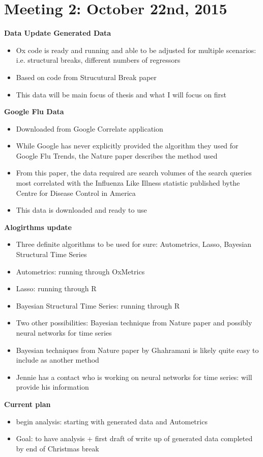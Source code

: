 \documentclass[11pt, oneside]{book}   	%
\begin{document}
\section{Meeting 2: October 22nd, 2015}
\textbf{Data Update Generated Data}
\begin{itemize}
\item Ox code is ready and running and able to be adjusted for multiple scenarios: i.e. structural breaks, different numbers of regressors
\item Based on code from Strucutural Break paper
\item This data will be main focus of thesis and what I will focus on first
\end{itemize}
\textbf{Google Flu Data}
\begin{itemize}
\item Downloaded from Google Correlate application
\item While Google has never explicitly provided the algorithm they used for Google Flu Trends, the Nature paper describes the method used
\item From this paper, the data required are search volumes of the search queries most correlated with the Influenza Like Illness statistic published bythe Centre for Disease Control in America
\item This data is downloaded and ready to use
\end {itemize}

\textbf{Alogirthms update}
\begin{itemize}
\item Three definite algorithms to be used for sure: Autometrics, Lasso, Bayesian Structural Time Series
\item Autometrics: running through OxMetrics
\item Lasso: running through R
\item Bayesian Structural Time Series: running through R
\item Two other possibilities: Bayesian technique from Nature paper and possibly neural networks for time series
\item Bayesian techniques from Nature paper by Ghahramani is likely quite easy to include as another method
\item Jennie has a contact who is working on neural networks for time series: will provide his information
\end{itemize}

\textbf{Current plan}
\begin{itemize}
\item begin analysis: starting with generated data and Autometrics
\item Goal: to have analysis + first draft of write up of generated data completed by end of Christmas break
\end{itemize}
\end{document}
